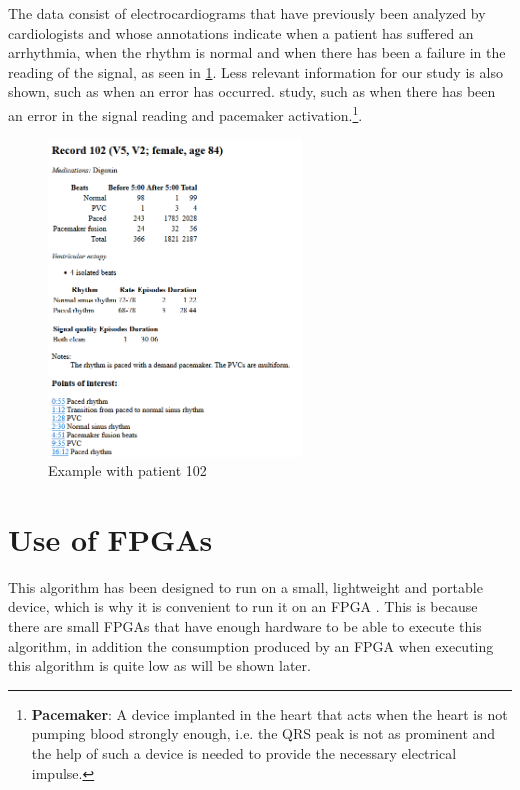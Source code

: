 The data consist of electrocardiograms that have previously been analyzed by cardiologists and whose annotations indicate when a patient has suffered an arrhythmia, when the rhythm is normal and when there has been a failure in the reading of the signal, as seen in \cref{fig:Paciente_pruebas_MIT}. Less relevant information for our study is also shown, such as when an error has occurred. study, such as when there has been an error in the signal reading and pacemaker activation.\footnote{\textbf{Pacemaker}: A device implanted in the heart that acts when the heart is not pumping blood strongly enough, i.e. the QRS peak is not as prominent and the help of such a device is needed to provide the necessary electrical impulse.}.

\begin{figure}[h]
	\centering
	\includegraphics[width=0.6\textwidth]{./Images/img_introduccion/Paciente_pruebas_MIT.png}
	\caption{Example with patient 102 \cite{mitdb}}
	\label{fig:Paciente_pruebas_MIT}
\end{figure}

\section*{Use of FPGAs}
This algorithm has been designed to run on a small, lightweight and portable device, which is why it is convenient to run it on an FPGA \cite{mdpi_sensors_2014}. This is because there are small FPGAs that have enough hardware to be able to execute this algorithm, in addition the consumption produced by an FPGA when executing this algorithm is quite low as will be shown later.

